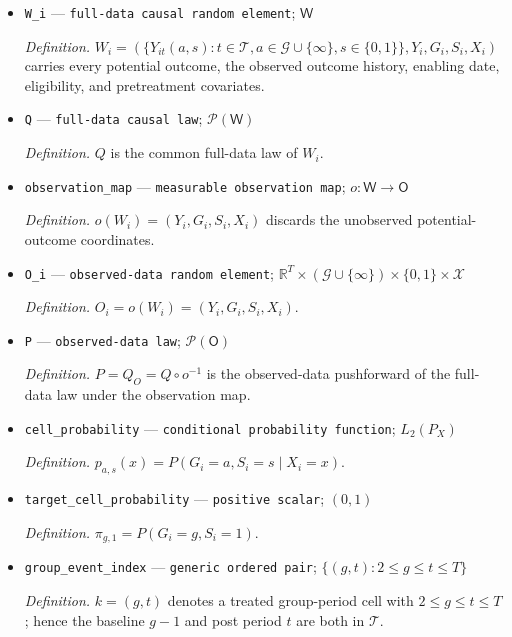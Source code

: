 \documentclass{article}
\begin{document}
\begin{itemize}
  \par\smallskip\noindent\emph{Definition.} The balanced observed outcome history for unit \(i\).
  \item \texttt{W\_\allowbreak{}i} --- \texttt{full-\allowbreak{}data causal random element}; \(\mathsf W\)
  \par\smallskip\noindent\emph{Definition.} \(W_i=(\{Y_{it}(a,s):t\in\mathcal T,a\in\mathcal G\cup\{\infty\},s\in\{0,1\}\},Y_i,G_i,S_i,X_i)\) carries every potential outcome, the observed outcome history, enabling date, eligibility, and pretreatment covariates.
  \item \texttt{Q} --- \texttt{full-\allowbreak{}data causal law}; \(\mathcal P(\mathsf W)\)
  \par\smallskip\noindent\emph{Definition.} \(Q\) is the common full-data law of \(W_i\).
  \item \texttt{observation\_\allowbreak{}map} --- \texttt{measurable observation map}; \(o:\mathsf W\to\mathsf O\)
  \par\smallskip\noindent\emph{Definition.} \(o(W_i)=(Y_i,G_i,S_i,X_i)\) discards the unobserved potential-outcome coordinates.
  \item \texttt{O\_\allowbreak{}i} --- \texttt{observed-\allowbreak{}data random element}; \(\mathbb R^T\times(\mathcal G\cup\{\infty\})\times\{0,1\}\times\mathcal X\)
  \par\smallskip\noindent\emph{Definition.} \(O_i=o(W_i)=(Y_i,G_i,S_i,X_i)\).
  \item \texttt{P} --- \texttt{observed-\allowbreak{}data law}; \(\mathcal P(\mathsf O)\)
  \par\smallskip\noindent\emph{Definition.} \(P=Q_O=Q\circ o^{-1}\) is the observed-data pushforward of the full-data law under the observation map.
  \item \texttt{cell\_\allowbreak{}probability} --- \texttt{conditional probability function}; \(L_2(P_X)\)
  \par\smallskip\noindent\emph{Definition.} \(p_{a,s}(x)=P(G_i=a,S_i=s\mid X_i=x)\).
  \item \texttt{target\_\allowbreak{}cell\_\allowbreak{}probability} --- \texttt{positive scalar}; \((0,1)\)
  \par\smallskip\noindent\emph{Definition.} \(\pi_{g,1}=P(G_i=g,S_i=1)\).
  \item \texttt{group\_\allowbreak{}event\_\allowbreak{}index} --- \texttt{generic ordered pair}; \(\{(g,t):2\le g\le t\le T\}\)
  \par\smallskip\noindent\emph{Definition.} \(k=(g,t)\) denotes a treated group-period cell with \(2\le g\le t\le T\); hence the baseline \(g-1\) and post period \(t\) are both in \(\mathcal T\).

\end{itemize}
\end{document}
